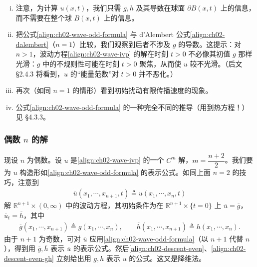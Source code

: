 \documentclass[../../main.tex]{subfiles}
\begin{document}
\begin{remark}\label{remark:ch02-wave-odd}
\begin{enumerate}[(i)]
\item 注意，为计算 $u(x,t)$，我们只需 $g,h$ 及其导数在球面 $\partial B(x,t)$ 上的信息，而不需要在整个球 $B(x,t)$ 上的信息。
\item 把公式\eqref{align:ch02-wave-odd-formula} 与 d'Alembert 公式\eqref{align:ch02-dalembert}（$n=1$）比较，我们观察到后者不涉及 $g$ 的导数。这提示：对 $n>1$，波动方程\eqref{align:ch02-wave-ivp} 的解在时刻 $t>0$ 不必像其初值 $g$ 那样光滑：$g$ 中的不规则性可能在时刻 $t>0$ 聚焦，从而使 $u$ 较不光滑。（后文 \S2.4.3 将看到，$u$ 的``能量范数''对 $t>0$ 并不恶化。）
\item 再次（如同 $n=1$ 的情形）看到初始扰动有限传播速度的现象。
\item 公式\eqref{align:ch02-wave-odd-formula} 的一种完全不同的推导（用到热方程！）见 \S4.3.3。
\end{enumerate}
\end{remark}

\subsubsection{偶数 $n$ 的解}

现设 $n$ 为偶数。设 $u$ 是\eqref{align:ch02-wave-ivp} 的一个 $C^m$ 解，$m=\dfrac{n+2}{2}$。我们要为 $u$ 构造形如\eqref{align:ch02-wave-odd-formula} 的表示公式。如同上面 $n=2$ 的技巧，注意到
\begin{align}\label{align:ch02-descent-even}
\overline{u}(x_1,\cdots,x_{n+1},t)\triangleq u(x_1,\cdots,x_n,t)
\end{align}
解 $\mathbb{R}^{n+1}\times(0,\infty)$ 中的波动方程，其初始条件为在 $\mathbb{R}^{n+1}\times\{t=0\}$ 上 $\overline{u}=\overline{g}$，$\overline{u}_t=\overline{h}$，其中
\begin{align}\label{align:ch02-descent-even-gh}
\overline{g}(x_1,\cdots,x_{n+1})\triangleq g(x_1,\cdots,x_n),\qquad
\overline{h}(x_1,\cdots,x_{n+1})\triangleq h(x_1,\cdots,x_n).
\end{align}
由于 $n+1$ 为奇数，可对 $\overline{u}$ 应用\eqref{align:ch02-wave-odd-formula}（以 $n+1$ 代替 $n$），得到用 $\overline{g},\overline{h}$ 表示 $\overline{u}$ 的表示公式。然后\eqref{align:ch02-descent-even}、\eqref{align:ch02-descent-even-gh} 立刻给出用 $g,h$ 表示 $u$ 的公式。这又是降维法。
\end{document}
